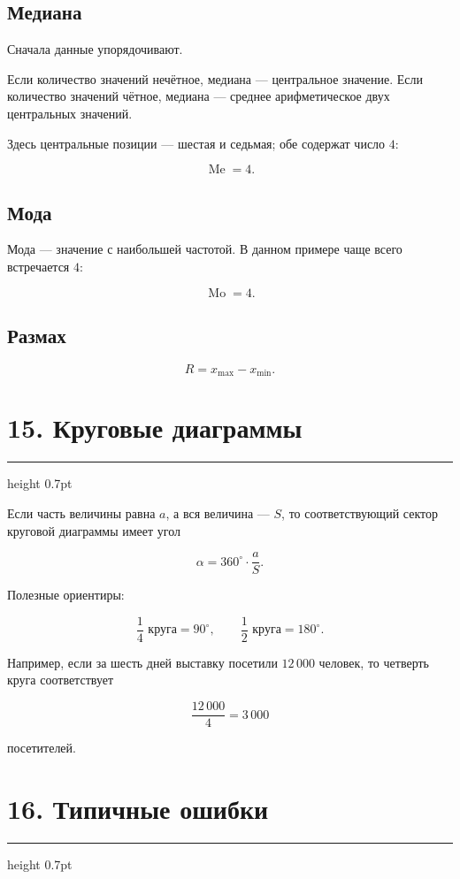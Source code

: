 \documentclass[a4paper,12pt]{article}
\newcommand{\sectionline}{%
    \vspace{-0.15em}
    {\color{accent}\hrule height 0.7pt}
    \vspace{0.55em}
}
\newcommand{\formula}[1]{%
    \[
        \boxed{\displaystyle #1}
    \]
}
\begin{document}
\subsection*{Медиана}

Сначала данные упорядочивают.

Если количество значений нечётное, медиана --- центральное значение. Если
количество значений чётное, медиана --- среднее арифметическое двух
центральных значений.

Здесь центральные позиции --- шестая и седьмая; обе содержат число $4$:

\[
\operatorname{Me}=4.
\]

\subsection*{Мода}

Мода --- значение с наибольшей частотой. В данном примере чаще всего
встречается $4$:

\[
\operatorname{Mo}=4.
\]

\subsection*{Размах}

\formula{R=x_{\max}-x_{\min}.}

\section*{\color{darkaccent}15. Круговые диаграммы}
\sectionline

Если часть величины равна $a$, а вся величина --- $S$, то соответствующий
сектор круговой диаграммы имеет угол

\formula{\alpha=360^\circ\cdot\frac{a}{S}.}

Полезные ориентиры:

\[
\frac14\text{ круга}=90^\circ,
\qquad
\frac12\text{ круга}=180^\circ.
\]

Например, если за шесть дней выставку посетили $12\,000$ человек, то четверть
круга соответствует

\[
\frac{12\,000}{4}=3\,000
\]

посетителей.

\section*{\color{darkaccent}16. Типичные ошибки}
\sectionline
\end{document}
